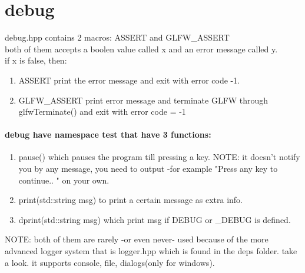\section{debug}
debug.hpp contains 2 macros: ASSERT and GLFW\_ASSERT \\
both of them accepts a boolen value called x and an error message called y.\\
if x is false, then:\\
\begin{enumerate}
  \item {ASSERT print the error message and exit with error code -1.} 
  \item {GLFW\_ASSERT print error message and terminate GLFW through glfwTerminate() and exit with error code = -1}
\end{enumerate}


\paragraph{debug have namespace test that have 3 functions:}
\begin{enumerate}{}
  \item {pause() which pauses the program till pressing a key. NOTE: it doesn't notify you by any message, you need to output -for example "Press any key to continue.. " on your own.}
  \item {print(std::string msg) to print a certain message as extra info.}
  \item {dprint(std::string msg) which print msg if DEBUG or \_DEBUG is defined.}
\end{enumerate}
NOTE: both of them are rarely -or even never- used because of the more advanced logger system that is logger.hpp which is found in the deps folder. take a look. it supports console, file, dialogs(only for windows).

